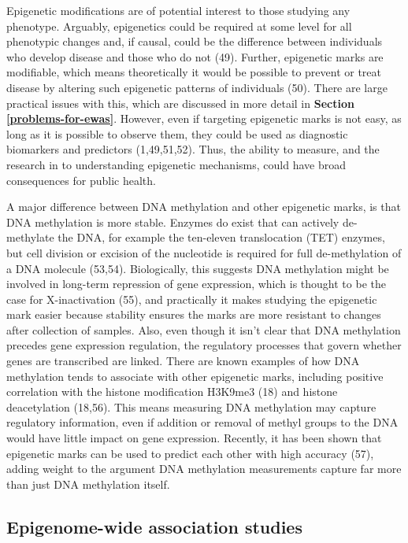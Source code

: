 \documentclass[11pt,oneside]{bristolthesis}
\begin{document}
Epigenetic modifications are of potential interest to those studying any phenotype. Arguably, epigenetics could be required at some level for all phenotypic changes and, if causal, could be the difference between individuals who develop disease and those who do not (49). Further, epigenetic marks are modifiable, which means theoretically it would be possible to prevent or treat disease by altering such epigenetic patterns of individuals (50). There are large practical issues with this, which are discussed in more detail in \textbf{Section \ref{problems-for-ewas}}. However, even if targeting epigenetic marks is not easy, as long as it is possible to observe them, they could be used as diagnostic biomarkers and predictors (1,49,51,52). Thus, the ability to measure, and the research in to understanding epigenetic mechanisms, could have broad consequences for public health.

A major difference between DNA methylation and other epigenetic marks, is that DNA methylation is more stable. Enzymes do exist that can actively de-methylate the DNA, for example the ten-eleven translocation (TET) enzymes, but cell division or excision of the nucleotide is required for full de-methylation of a DNA molecule (53,54). Biologically, this suggests DNA methylation might be involved in long-term repression of gene expression, which is thought to be the case for X-inactivation (55), and practically it makes studying the epigenetic mark easier because stability ensures the marks are more resistant to changes after collection of samples. Also, even though it isn't clear that DNA methylation precedes gene expression regulation, the regulatory processes that govern whether genes are transcribed are linked. There are known examples of how DNA methylation tends to associate with other epigenetic marks, including positive correlation with the histone modification H3K9me3 (18) and histone deacetylation (18,56). This means measuring DNA methylation may capture regulatory information, even if addition or removal of methyl groups to the DNA would have little impact on gene expression. Recently, it has been shown that epigenetic marks can be used to predict each other with high accuracy (57), adding weight to the argument DNA methylation measurements capture far more than just DNA methylation itself.

\hypertarget{ewas}{%
\subsection{Epigenome-wide association studies}\label{ewas}}
\end{document}
